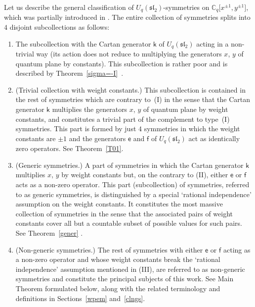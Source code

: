 \documentclass[10pt,a4paper]{amsart}
\numberwithin{equation}{section}
\begin{document}
Let us describe the general classification of $U_q(\mathfrak{sl}_2)$-symmetries on $\mathbb{C}_q\big[x^{\pm 1},y^{\pm 1}\big]$, which was partially introduced in \cite{S}. The entire collection of symmetries splits into $4$ disjoint subcollections as follows:
\begin{enumerate}\itemsep=0pt
\item[I] The subcollection with the Cartan generator $\mathsf{k}$ of $U_q(\mathfrak{sl}_2)$ acting in a non-trivial way (its action does not reduce to multiplying the generators $x$, $y$ of quantum plane by constants). This subcollection is rather poor and is described by Theorem~\ref{sigma=-I}~\cite[Theorem 3.5]{S}.

\item[II] (Trivial collection with weight constants.) This subcollection is contained in the rest of symmetries which are contrary to~(I) in the sense that the Cartan generator $\mathsf{k}$ multiplies the generators $x$, $y$ of quantum plane by weight constants, and constitutes a trivial part of the complement to type~(I) symmetries. This part is formed by just $4$ symmetries in which the weight constants are $\pm 1$ and the generators $\mathsf{e}$ and $\mathsf{f}$ of $U_q(\mathfrak{sl}_2)$ act as identically zero operators. See Theorem~\ref{T01}.

\item[III] (Generic symmetries.) A part of symmetries in which the Cartan generator $\mathsf{k}$ multiplies $x$, $y$ by weight constants but, on the contrary to (II), either $\mathsf{e}$ or $\mathsf{f}$ acts as a non-zero operator. This part (subcollection) of symmetries, referred to as generic symmetries, is distinguished by a special `rational independence' assumption on the weight constants. It constitutes the most massive collection of symmetries in the sense that the associated pairs of weight constants cover all but a countable subset of possible values for such pairs. See Theorem~\ref{gener} \cite[Theorem~4.1]{S}.

\item[IV] (Non-generic symmetries.) The rest of symmetries with either $\mathsf{e}$ or $\mathsf{f}$ acting as a non-zero operator and whose weight constants break the `rational independence' assumption mentioned in (III), are referred to as non-generic symmetries and constitute the principal subjects of this work. See Main Theorem formulated below, along with the related terminology and definitions in Sections~\ref{wpem} and~\ref{clngs}.
\end{enumerate}
\end{document}
